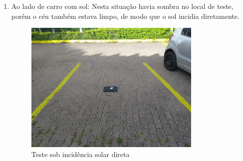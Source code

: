 \documentclass[oneside,openright,12pt]{ufsm_2015} %
\begin{document}
\begin{enumerate}
        \item Ao lado de carro com sol: Nesta situação havia sombra no local de teste, porém o céu também estava limpo, de modo que o sol incidia diretamente.
        
        \begin{figure}[ht]
     	    \caption{\label{exepretex} Teste sob incidência solar direta}
            \centering
            \includegraphics[width=0.8\textwidth]{figuras/teste6.jpg}
            \vspace{\baselineskip} %
        \end{figure}
    \end{enumerate}
    
\end{document}
